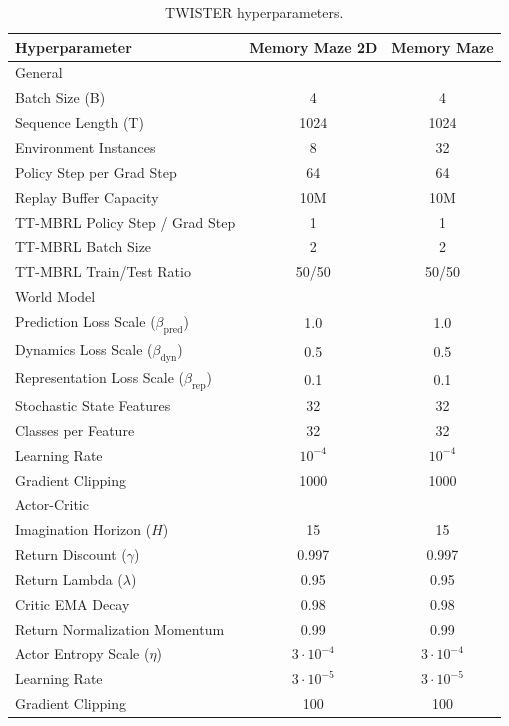 \newpage

\begin{table}[!ht]
\caption{TWISTER hyperparameters.}
\setlength{\tabcolsep}{20pt}
\renewcommand{\arraystretch}{1.25}
\centering
\hfill \break
\begin{tabular}{lcc}
\toprule
Hyperparameter & Memory Maze 2D & Memory Maze \\ 
\midrule
General & \\
Batch Size (B) & 4 & 4 \\
Sequence Length (T) & 1024 & 1024 \\
Environment Instances & 8 & 32 \\
Policy Step per Grad Step & 64 & 64 \\
Replay Buffer Capacity & 10M & 10M \\
TT-MBRL Policy Step / Grad Step & 1 & 1 \\
TT-MBRL Batch Size & 2 & 2 \\
TT-MBRL Train/Test Ratio & 50/50 & 50/50 \\
\midrule
World Model & \\
Prediction Loss Scale ($\beta_{\text{pred}}$) & 1.0 & 1.0 \\
Dynamics Loss Scale ($\beta_{\text{dyn}}$) & 0.5 & 0.5 \\
Representation Loss Scale ($\beta_{\text{rep}}$) & 0.1 & 0.1\\
Stochastic State Features & 32 & 32\\
Classes per Feature & 32 & 32\\
Learning Rate & $10^{-4}$ & $10^{-4}$\\
Gradient Clipping & 1000 & 1000 \\
\midrule
Actor-Critic & \\
Imagination Horizon ($H$) & 15 & 15\\
Return Discount ($\gamma$) & 0.997 & 0.997\\
Return Lambda ($\lambda$) & 0.95 & 0.95\\
Critic EMA Decay & 0.98 & 0.98 \\
Return Normalization Momentum & 0.99 & 0.99 \\
Actor Entropy Scale ($\eta$) & $3 \cdot 10^{-4}$ & $3 \cdot 10^{-4}$\\
Learning Rate & $3 \cdot 10^{-5}$ & $3 \cdot 10^{-5}$\\
Gradient Clipping & 100 & 100 \\
\bottomrule
\end{tabular}
\label{table:hyperparams_twister}
\end{table}

